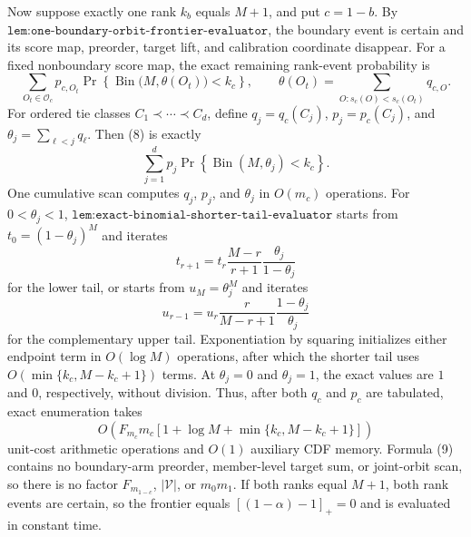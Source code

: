 Now suppose exactly one rank \(k_b\) equals \(M+1\), and put \(c=1-b\). By \(\texttt{lem:one-boundary-orbit-frontier-evaluator}\), the boundary event is certain and its score map, preorder, target lift, and calibration coordinate disappear. For a fixed nonboundary score map, the exact remaining rank-event probability is
\[
\sum_{O_t\in\mathcal O_c}p_{c,O_t}
\Pr\!\left\{\operatorname{Bin}\bigl(M,\theta(O_t)\bigr)<k_c\right\},\qquad
\theta(O_t)=\sum_{O:s_c(O)<s_c(O_t)}q_{c,O}.
\tag{8}
\]
For ordered tie classes \(C_1\prec\cdots\prec C_d\), define \(q_j=q_c(C_j)\), \(p_j=p_c(C_j)\), and \(\theta_j=\sum_{\ell<j}q_\ell\). Then (8) is exactly
\[
\sum_{j=1}^d p_j\Pr\!\left\{\operatorname{Bin}(M,\theta_j)<k_c\right\}.
\tag{9}
\]
One cumulative scan computes \(q_j\), \(p_j\), and \(\theta_j\) in \(O(m_c)\) operations. For \(0<\theta_j<1\), \(\texttt{lem:exact-binomial-shorter-tail-evaluator}\) starts from \(t_0=(1-\theta_j)^M\) and iterates
\[
t_{r+1}=t_r\frac{M-r}{r+1}\frac{\theta_j}{1-\theta_j}
\]
for the lower tail, or starts from \(u_M=\theta_j^M\) and iterates
\[
u_{r-1}=u_r\frac{r}{M-r+1}\frac{1-\theta_j}{\theta_j}
\]
for the complementary upper tail. Exponentiation by squaring initializes either endpoint term in \(O(\log M)\) operations, after which the shorter tail uses \(O(\min\{k_c,M-k_c+1\})\) terms. At \(\theta_j=0\) and \(\theta_j=1\), the exact values are \(1\) and \(0\), respectively, without division. Thus, after both \(q_c\) and \(p_c\) are tabulated, exact enumeration takes
\[
O\!\left(F_{m_c}m_c\left[1+\log M+\min\{k_c,M-k_c+1\}\right]\right)
\tag{10}
\]
unit-cost arithmetic operations and \(O(1)\) auxiliary CDF memory. Formula (9) contains no boundary-arm preorder, member-level target sum, or joint-orbit scan, so there is no factor \(F_{m_{1-c}}\), \(|\mathcal V|\), or \(m_0m_1\). If both ranks equal \(M+1\), both rank events are certain, so the frontier equals \([(1-\alpha)-1]_+=0\) and is evaluated in constant time.


